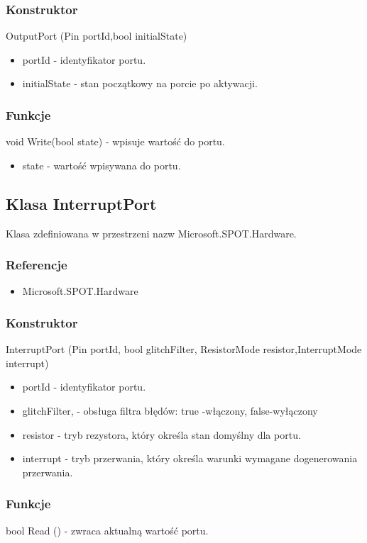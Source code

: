 \documentclass{article}
\begin{document}
\subsubsection{Konstruktor}
 OutputPort (Pin portId,bool initialState)
\begin{itemize}
\item portId - identyfikator portu.
\item initialState - stan początkowy na porcie po aktywacji.
\end{itemize}
\subsubsection{Funkcje}
void Write(bool state) - wpisuje wartość do portu.
\begin{itemize}
\item state - wartość wpisywana do portu.
\end{itemize}

\newpage
\subsection{Klasa InterruptPort}
Klasa zdefiniowana w przestrzeni nazw Microsoft.SPOT.Hardware.
\subsubsection{Referencje}
\begin{itemize}
\item Microsoft.SPOT.Hardware
\end{itemize}
\subsubsection{Konstruktor}
 InterruptPort (Pin portId, bool glitchFilter, ResistorMode resistor,\newline InterruptMode interrupt)
\begin{itemize}
\item portId - identyfikator portu.
\item glitchFilter, - obsługa filtra błędów: true -włączony, false-wyłączony
\item resistor - tryb rezystora, który określa stan domyślny dla portu.
\item interrupt - tryb przerwania, który określa warunki wymagane do\newline generowania przerwania.
\end{itemize}
\subsubsection{Funkcje}
bool Read () - zwraca aktualną wartość portu.
\end{document}
